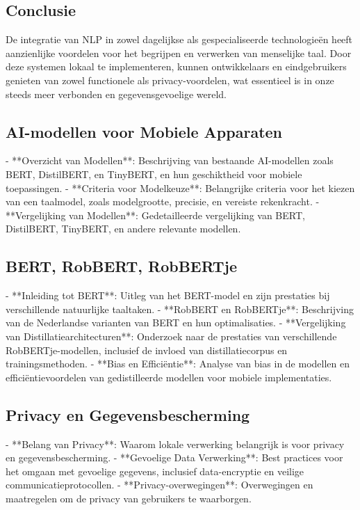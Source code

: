 \subsection{Conclusie}

De integratie van NLP in zowel dagelijkse als gespecialiseerde technologieën heeft aanzienlijke voordelen voor het begrijpen en verwerken van menselijke taal. Door deze systemen lokaal te implementeren, kunnen ontwikkelaars en eindgebruikers genieten van zowel functionele als privacy-voordelen, wat essentieel is in onze steeds meer verbonden en gegevensgevoelige wereld.


\subsection{ AI-modellen voor Mobiele Apparaten}

- **Overzicht van Modellen**: Beschrijving van bestaande AI-modellen zoals BERT, DistilBERT, en TinyBERT, en hun geschiktheid voor mobiele toepassingen.
- **Criteria voor Modelkeuze**: Belangrijke criteria voor het kiezen van een taalmodel, zoals modelgrootte, precisie, en vereiste rekenkracht.
- **Vergelijking van Modellen**: Gedetailleerde vergelijking van BERT, DistilBERT, TinyBERT, en andere relevante modellen.

\subsection{ BERT, RobBERT, RobBERTje}

- **Inleiding tot BERT**: Uitleg van het BERT-model en zijn prestaties bij verschillende natuurlijke taaltaken.
- **RobBERT en RobBERTje**: Beschrijving van de Nederlandse varianten van BERT en hun optimalisaties.
- **Vergelijking van Distillatiearchitecturen**: Onderzoek naar de prestaties van verschillende RobBERTje-modellen, inclusief de invloed van distillatiecorpus en trainingsmethoden.
- **Bias en Efficiëntie**: Analyse van bias in de modellen en efficiëntievoordelen van gedistilleerde modellen voor mobiele implementaties.

\subsection{Privacy en Gegevensbescherming}

- **Belang van Privacy**: Waarom lokale verwerking belangrijk is voor privacy en gegevensbescherming.
- **Gevoelige Data Verwerking**: Best practices voor het omgaan met gevoelige gegevens, inclusief data-encryptie en veilige communicatieprotocollen.
- **Privacy-overwegingen**: Overwegingen en maatregelen om de privacy van gebruikers te waarborgen.

